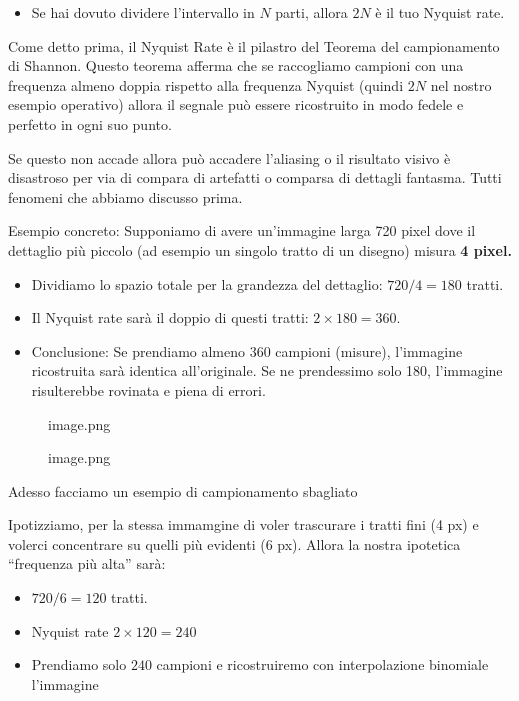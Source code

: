 \documentclass[
]{article}
\providecommand{\tightlist}{%
  \setlength{\itemsep}{0pt}\setlength{\parskip}{0pt}}
\begin{document}
\begin{itemize}
\tightlist
\item
  Se hai dovuto dividere l'intervallo in \(N\) parti, allora \(2N\) è il tuo Nyquist rate.
\end{itemize}

Come detto prima, il Nyquist Rate è il pilastro del Teorema del campionamento di Shannon. Questo teorema afferma che se raccogliamo campioni con una frequenza almeno doppia rispetto alla frequenza Nyquist (quindi \textbf{\(2N\)} nel nostro esempio operativo) allora il segnale può essere ricostruito in modo fedele e perfetto in ogni suo punto.

Se questo non accade allora può accadere l'aliasing o il risultato visivo è disastroso per via di compara di artefatti o comparsa di dettagli fantasma. Tutti fenomeni che abbiamo discusso prima.

Esempio concreto:
Supponiamo di avere un'immagine larga 720 pixel dove il dettaglio più piccolo (ad esempio un singolo tratto di un disegno) misura \textbf{4 pixel.}

\begin{itemize}
\tightlist
\item
  Dividiamo lo spazio totale per la grandezza del dettaglio: \(720/4 = 180\) tratti.
\item
  Il Nyquist rate sarà il doppio di questi tratti: \(2 \times 180 = 360\).
\item
  Conclusione: Se prendiamo almeno 360 campioni (misure), l'immagine ricostruita sarà identica all'originale. Se ne prendessimo solo 180, l'immagine risulterebbe rovinata e piena di errori.
\end{itemize}

\begin{figure}
\centering
{image.png}
\caption{image.png}
\end{figure}

Adesso facciamo un esempio di campionamento sbagliato

Ipotizziamo, per la stessa immamgine di voler trascurare i tratti fini (4 px) e volerci concentrare su quelli più evidenti (6 px). Allora la nostra ipotetica ``frequenza più alta'' sarà:

\begin{itemize}
\tightlist
\item
  \(720/6 = 120\) tratti.
\item
  Nyquist rate \(2 \times 120 = 240\)
\item
  Prendiamo solo \(240\) campioni e ricostruiremo con interpolazione binomiale l'immagine
\end{itemize}
\end{document}

